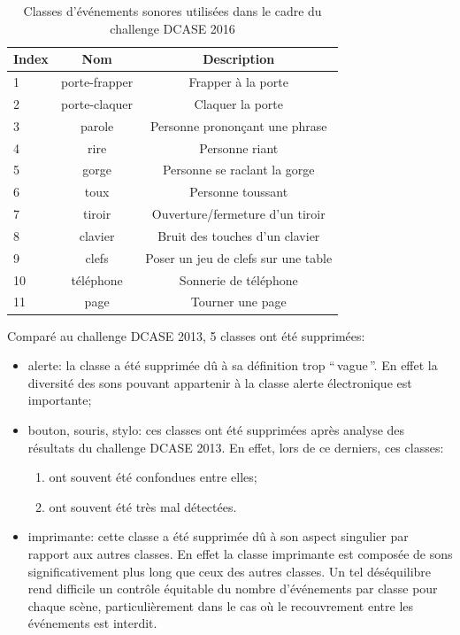 \begin{table}[t]
\begin{center}
\begin{tabular}{lcc}
\textbf{Index} & \textbf{Nom}  & \textbf{Description}  \\ 
\hline
1   & porte-frapper & Frapper à la porte \\
2   & porte-claquer & Claquer la porte \\
3   & parole        & Personne  prononçant une phrase \\
4   & rire          & Personne riant  \\    
5   & gorge         & Personne se raclant la gorge  \\
6   & toux          & Personne toussant \\
7   & tiroir        & Ouverture/fermeture d'un tiroir \\
8   & clavier       & Bruit des touches d'un clavier \\
9   & clefs         & Poser un jeu de clefs sur une table \\    
10  & téléphone     & Sonnerie de téléphone \\
11  & page          & Tourner une page \\     
\hline      
\end{tabular}
\end{center}
\caption{Classes d'événements sonores utilisées dans le cadre du challenge DCASE 2016}
\label{tab:eventDCASE2016}
\end{table}

Comparé au challenge DCASE 2013, 5 classes ont été supprimées:

\begin{itemize}
\item alerte: la classe a été supprimée dû à sa définition trop ``\,vague\,''. En effet la diversité des sons pouvant  appartenir à la classe alerte électronique est importante;

\item bouton, souris, stylo: ces classes ont été supprimées après analyse des résultats du challenge DCASE 2013. En effet, lors de ce derniers, ces classes:

\begin{enumerate}
\item ont souvent été confondues entre elles;
\item ont souvent été très mal détectées. 
\end{enumerate}

\item imprimante: cette classe a été supprimée dû à son aspect singulier par rapport aux autres classes. En effet la classe imprimante est composée de sons significativement plus long que ceux des autres classes. Un tel déséquilibre rend difficile un contrôle équitable du nombre d'événements par classe pour chaque scène, particulièrement dans le cas où le recouvrement entre les événements est interdit.

\end{itemize}

